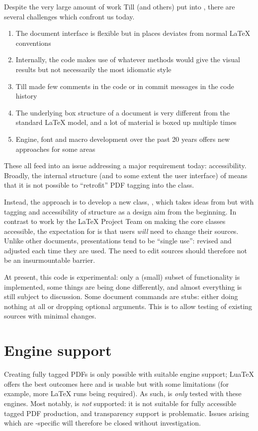 \documentclass{l3doc}
\begin{document}
\begin{documentation}
Despite the very large amount of work Till (and others) put into ,
there are several challenges which confront us today.
\begin{enumerate}
  \item The document interface is flexible but in places deviates from normal
    \LaTeX{} conventions
  \item Internally, the code makes use of whatever methods would give the
    visual results but not necessarily the most idiomatic style
  \item Till made few comments in the code or in commit messages in the code
    history
  \item The underlying box structure of a  document is very
    different from the standard \LaTeX{} model, and a lot of material is
    boxed up multiple times
  \item Engine, font and macro development over the past 20 years offers
    new approaches for some areas
\end{enumerate}
These all feed into an issue addressing a major requirement today:
accessibility. Broadly, the internal structure (and to some extent the user
interface) of  means that it is not possible to \enquote{retrofit}
PDF tagging into the class.

Instead, the approach is to develop a new class, , which takes
ideas from  but with tagging and accessibility of structure as a
design aim from the beginning. In contrast to work by the \LaTeX{} Project Team
on making the core classes accessible, the expectation for  is
that users \emph{will} need to change their sources. Unlike other documents,
presentations tend to be \enquote{single use}: revised and adjusted each time
they are used. The need to edit sources should therefore not be an
insurmountable barrier.

At present, this code is experimental: only a (small) subset of 
functionality is implemented, some things are being done differently, and
almost everything is still subject to discussion. Some document commands are
stubs: either doing nothing at all or dropping optional arguments. This is to
allow testing of existing  sources with minimal changes.

\section{Engine support}

Creating fully tagged PDFs is only possible with suitable engine support;
Lua\TeX{} offers the best outcomes here and \pdfTeX{} is usable but with some
limitations (for example, more \LaTeX{} runs being required). As such,
 is \emph{only} tested with these engines. Most notably, \XeTeX{}
is \emph{not} supported: it is not suitable for fully accessible tagged PDF
production, and transparency support is problematic. Issues arising which are
\XeTeX{}-specific will therefore be closed without investigation.


\end{documentation}
\end{document}
